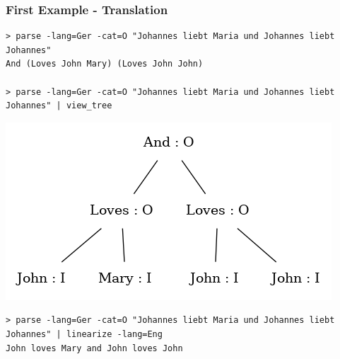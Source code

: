 \documentclass{beamer}
\begin{document}
\begin{frame}[fragile]
    \frametitle{First Example - Translation}
\begin{lstlisting}[language=GFcmd, breaklines=true]
> parse -lang=Ger -cat=O "Johannes liebt Maria und Johannes liebt Johannes"
And (Loves John Mary) (Loves John John)

> parse -lang=Ger -cat=O "Johannes liebt Maria und Johannes liebt Johannes" | view_tree
\end{lstlisting}
    \includegraphics[scale=0.3]{graph_1.png}
\begin{lstlisting}[language=GFcmd, breaklines=true]
> parse -lang=Ger -cat=O "Johannes liebt Maria und Johannes liebt Johannes" | linearize -lang=Eng
John loves Mary and John loves John
\end{lstlisting}
\end{frame}
\end{document}
